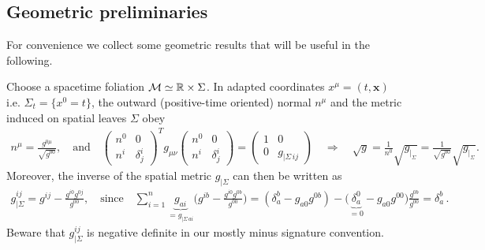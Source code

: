 \documentclass[../QFT_main.tex]{subfiles}
\begin{document}
\subsection{Geometric preliminaries}\label{sec:geometric_preliminaries}
For convenience we collect some geometric results that will be useful in the following.

\begin{mytheorem}
%
Choose a spacetime foliation $\mathcal{M}\simeq \mathbb{R}\times\Sigma$.
In adapted coordinates $x^\mu=(t,\mathbf{x})$ i.e. $\Sigma_t=\{x^0=t\}$, the outward (positive-time oriented) normal $n^\mu$ and the metric induced on spatial leaves $\Sigma$ obey
{\small
\begin{align}\label{eq:metric_induced_spatial_leaves_folitation}
    n^\mu = \frac{g^{0\mu}}{\sqrt{g^{00}}}, \quad \text{and}\quad
    \begin{pmatrix}
      n^0 & 0\\
      n^i & \delta^i_j
    \end{pmatrix}^T
    g_{\mu\nu}
    \begin{pmatrix}
      n^0 & 0\\
      n^i & \delta^i_j
    \end{pmatrix}= \begin{pmatrix}
      1 & 0\\
     0 & g_{|\Sigma\, ij}
    \end{pmatrix}\quad \Rightarrow \quad \sqrt{g} = \frac{1}{n^0}\sqrt{g_{|_\Sigma}}= \frac{1}{\sqrt{g^{00}}}\sqrt{g_{|_\Sigma}}.
\end{align}
}
Moreover, the inverse of the spatial metric $g_{|\Sigma}$ can then be written as
{\small
\begin{align}\label{eq:inverse_metric_induced_leaves_foliation}
    g_{|\Sigma}^{ij}= g^{ij} - \tfrac{g^{i0}g^{0j}}{g^{00}},\quad\text{since}\quad
    \sum_{i=1}^n \underbrace{g_{ai}}_{=g_{|\Sigma\, ai}} \Big(g^{ib} - \tfrac{g^{i0}g^{0b}}{g^{00}}\Big) = (\delta_a^b - g_{a0} g^{0b}) -\big(\underbrace{\delta_a^0}_{=0} - g_{a0} g^{00}\big) \tfrac{g^{0b}}{g^{00}}= \delta_a^b\,.
\end{align}}
Beware that $g_{|\Sigma}^{ij}$ is negative definite in our mostly minus signature convention.
\end{mytheorem}
\end{document}
